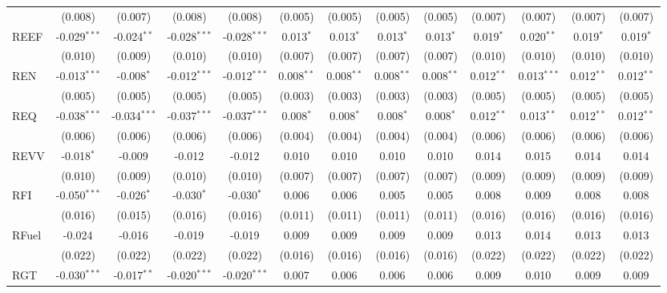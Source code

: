 \begin{table}[!htbp]
\begin{tabular}{@{\extracolsep{5pt}}lcccccccccccc}
  & (0.008) & (0.007) & (0.008) & (0.008) & (0.005) & (0.005) & (0.005) & (0.005) & (0.007) & (0.007) & (0.007) & (0.007) \\
 REEF & -0.029$^{***}$ & -0.024$^{**}$ & -0.028$^{***}$ & -0.028$^{***}$ & 0.013$^{*}$ & 0.013$^{*}$ & 0.013$^{*}$ & 0.013$^{*}$ & 0.019$^{*}$ & 0.020$^{**}$ & 0.019$^{*}$ & 0.019$^{*}$ \\
  & (0.010) & (0.009) & (0.010) & (0.010) & (0.007) & (0.007) & (0.007) & (0.007) & (0.010) & (0.010) & (0.010) & (0.010) \\
 REN & -0.013$^{***}$ & -0.008$^{*}$ & -0.012$^{***}$ & -0.012$^{***}$ & 0.008$^{**}$ & 0.008$^{**}$ & 0.008$^{**}$ & 0.008$^{**}$ & 0.012$^{**}$ & 0.013$^{***}$ & 0.012$^{**}$ & 0.012$^{**}$ \\
  & (0.005) & (0.005) & (0.005) & (0.005) & (0.003) & (0.003) & (0.003) & (0.003) & (0.005) & (0.005) & (0.005) & (0.005) \\
 REQ & -0.038$^{***}$ & -0.034$^{***}$ & -0.037$^{***}$ & -0.037$^{***}$ & 0.008$^{*}$ & 0.008$^{*}$ & 0.008$^{*}$ & 0.008$^{*}$ & 0.012$^{**}$ & 0.013$^{**}$ & 0.012$^{**}$ & 0.012$^{**}$ \\
  & (0.006) & (0.006) & (0.006) & (0.006) & (0.004) & (0.004) & (0.004) & (0.004) & (0.006) & (0.006) & (0.006) & (0.006) \\
 REVV & -0.018$^{*}$ & -0.009$^{}$ & -0.012$^{}$ & -0.012$^{}$ & 0.010$^{}$ & 0.010$^{}$ & 0.010$^{}$ & 0.010$^{}$ & 0.014$^{}$ & 0.015$^{}$ & 0.014$^{}$ & 0.014$^{}$ \\
  & (0.010) & (0.009) & (0.010) & (0.010) & (0.007) & (0.007) & (0.007) & (0.007) & (0.009) & (0.009) & (0.009) & (0.009) \\
 RFI & -0.050$^{***}$ & -0.026$^{*}$ & -0.030$^{*}$ & -0.030$^{*}$ & 0.006$^{}$ & 0.006$^{}$ & 0.005$^{}$ & 0.005$^{}$ & 0.008$^{}$ & 0.009$^{}$ & 0.008$^{}$ & 0.008$^{}$ \\
  & (0.016) & (0.015) & (0.016) & (0.016) & (0.011) & (0.011) & (0.011) & (0.011) & (0.016) & (0.016) & (0.016) & (0.016) \\
 RFuel & -0.024$^{}$ & -0.016$^{}$ & -0.019$^{}$ & -0.019$^{}$ & 0.009$^{}$ & 0.009$^{}$ & 0.009$^{}$ & 0.009$^{}$ & 0.013$^{}$ & 0.014$^{}$ & 0.013$^{}$ & 0.013$^{}$ \\
  & (0.022) & (0.022) & (0.022) & (0.022) & (0.016) & (0.016) & (0.016) & (0.016) & (0.022) & (0.022) & (0.022) & (0.022) \\
 RGT & -0.030$^{***}$ & -0.017$^{**}$ & -0.020$^{***}$ & -0.020$^{***}$ & 0.007$^{}$ & 0.006$^{}$ & 0.006$^{}$ & 0.006$^{}$ & 0.009$^{}$ & 0.010$^{}$ & 0.009$^{}$ & 0.009$^{}$ \\

\end{tabular}
\end{table}
